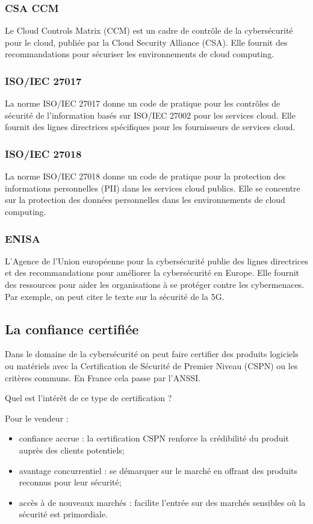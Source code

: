 \subsubsection{CSA CCM}
Le  Cloud Controls Matrix (CCM) est un cadre de contrôle de la cybersécurité pour le cloud, publiée par la Cloud Security Alliance (CSA). Elle fournit des recommandations pour sécuriser les environnements de cloud computing.
	
\subsubsection{ISO/IEC 27017}
La norme ISO/IEC 27017 donne un code de pratique pour les contrôles de sécurité de l'information basés sur ISO/IEC 27002 pour les services cloud. Elle fournit des lignes directrices spécifiques pour les fournisseurs de services cloud.
	
\subsubsection{ISO/IEC 27018}
La norme ISO/IEC 27018 donne un code de pratique pour la protection des informations personnelles (PII) dans les services cloud publics. Elle se concentre sur la protection des données personnelles dans les environnements de cloud computing.
	
\subsubsection{ENISA}
L'Agence de l'Union européenne pour la cybersécurité publie des lignes directrices et des recommandations pour améliorer la cybersécurité en Europe. Elle fournit des ressources pour aider les organisations à se protéger contre les cybermenaces. Par exemple, on peut citer le texte sur la sécurité de la 5G.
	
\subsection{La confiance certifiée}
Dans le domaine de la cybersécurité on peut faire certifier des produits logiciels ou matériels avec la Certification de Sécurité de Premier Niveau (CSPN) ou les critères communs. En France cela passe par l'ANSSI.

Quel est l'intérêt de ce type de certification ?

Pour le vendeur :
\begin{itemize}
	\item confiance accrue : la certification CSPN renforce la crédibilité du produit auprès des clients potentiels;
	\item avantage concurrentiel : se démarquer sur le marché en offrant des produits reconnus pour leur sécurité;
	\item accès à de nouveaux marchés : facilite l'entrée sur des marchés sensibles où la sécurité est primordiale.
\end{itemize}

